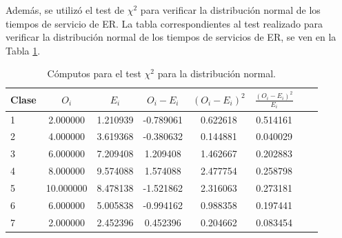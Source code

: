 \documentclass[a4paper,10pt]{article}
\begin{document}
Además, se utilizó el test de $\chi^2$ para verificar la distribución normal de los tiempos de servicio de ER. La tabla correspondientes al test realizado para verificar la distribución normal de los tiempos de servicios de ER, se ven en la Tabla \ref{tab:chi_table_norm}. %


\begin{table}[ht]
\begin{center}
\begin{tabular}{l*{6}{c}r}
\hline
Clase& $O_i$ & $E_i$  & $O_i - E_i$ & $(O_i - E_i)^2$ & $\frac{(O_i - E_i)^2}{E_i}$\\
\hline
1&2.000000&1.210939&-0.789061&0.622618&0.514161\\
2&4.000000&3.619368&-0.380632&0.144881&0.040029\\
3&6.000000&7.209408&1.209408&1.462667&0.202883\\
4&8.000000&9.574088&1.574088&2.477754&0.258798\\
5&10.000000&8.478138&-1.521862&2.316063&0.273181\\
6&6.000000&5.005838&-0.994162&0.988358&0.197441\\
7&2.000000&2.452396&0.452396&0.204662&0.083454\\
\hline
\end{tabular}
\caption{\label{tab:chi_table_norm} Cómputos para el test $\chi^2$ para la distribución normal.}
\end{center}
\end{table}

\end{document}
